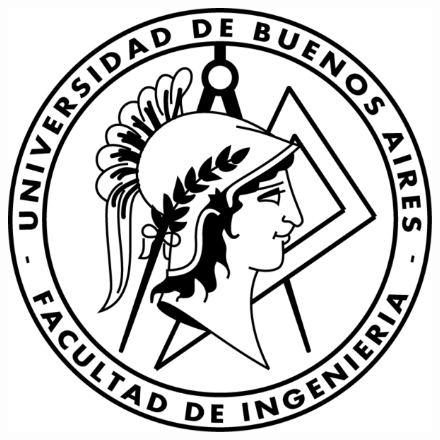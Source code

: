 \vspace*{0.30in}


\begin{figure}[htp]
				\begin{center}
					\includegraphics[scale=1]{imagen_fiuba.png} 
				\end{center}
			\end{figure} 
            
